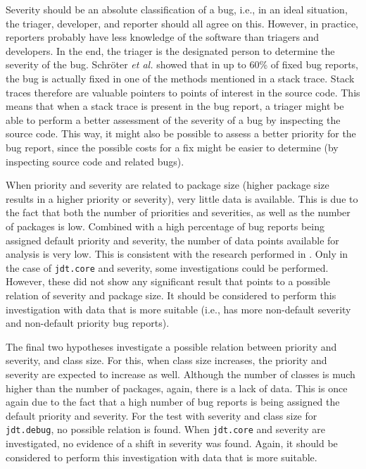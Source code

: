 Severity should be an absolute classification of a bug, i.e., in an ideal situation, the triager, developer, and reporter should all agree on this. However, in practice, reporters probably have less knowledge of the software than triagers and developers. In the end, the triager is the designated person to determine the severity of the bug. Schr\"{o}ter \emph{et al.} \cite{Schroter2010} showed that in up to 60\% of fixed bug reports, the bug is actually fixed in one of the methods mentioned in a stack trace. Stack traces therefore are valuable pointers to points of interest in the source code. This means that when a stack trace is present in the bug report, a triager might be able to perform a better assessment of the severity of a bug by inspecting the source code. This way, it might also be possible to assess a better priority for the bug report, since the possible costs for a fix might be easier to determine (by inspecting source code and related bugs).

When priority and severity are related to package size (higher package size results in a higher priority or severity), very little data is available. This is due to the fact that both the number of priorities and severities, as well as the number of packages is low. Combined with a high percentage of bug reports being assigned default priority and severity, the number of data points available for analysis is very low. This is consistent with the research performed in \cite{Lamkanfi2010}. Only in the case of \texttt{jdt.core} and severity, some investigations could be performed. However, these did not show any significant result that points to a possible relation of severity and package size. It should be considered to perform this investigation with data that is more suitable (i.e., has more non-default severity and non-default priority bug reports).

The final two hypotheses investigate a possible relation between priority and severity, and class size. For this, when class size increases, the priority and severity are expected to increase as well. Although the number of classes is much higher than the number of packages, again, there is a lack of data. This is once again due to the fact that a high number of bug reports is being assigned the default priority and severity. For the test with severity and class size for \texttt{jdt.debug}, no possible relation is found. When \texttt{jdt.core} and severity are investigated, no evidence of a shift in severity was found. Again, it should be considered to perform this investigation with data that is more suitable.

